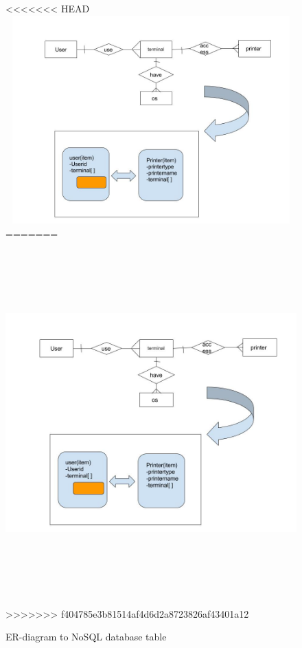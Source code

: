  \begin{figure}[h]
<<<<<<< HEAD
 \includegraphics[width=15cm, height=8cm]{2.jpg}
=======
 \includegraphics[width=15cm, height=14cm]{2.jpg}
>>>>>>> f404785e3b81514af4d6d2a8723826af43401a12
 \centering
 \caption{\label{fig:1}ER-diagram to NoSQL database table}
 \end{figure}

